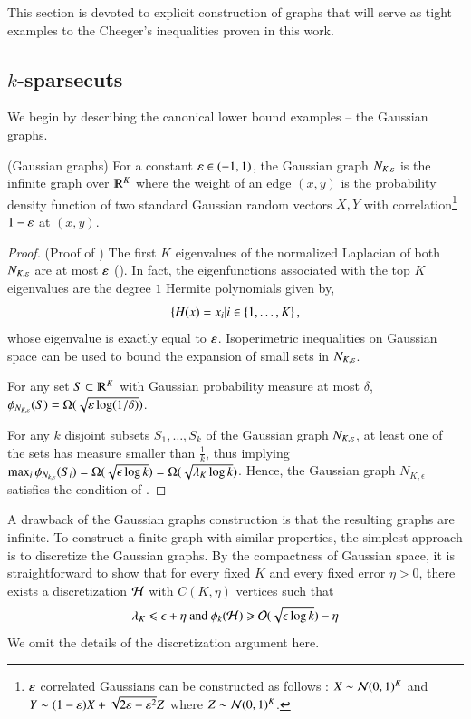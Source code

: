 \documentclass[11pt]{article}
\begin{document}
This section is devoted to explicit construction of graphs that
will serve as tight examples to the Cheeger's inequalities proven in
this work.
%
\subsection{$k$-sparsecuts}
%
We begin by describing the canonical lower bound examples -- the
Gaussian graphs.
\begin{definition} (Gaussian graphs)
For a constant $ \varepsilon \in (-1, 1)$, the Gaussian graph $N_{K,\varepsilon}$ is the
infinite graph over $\R^K$ where the weight
of an edge $(x,y)$ is the probability density function of two standard Gaussian random vectors $X,Y$ with 
correlation\footnote{$\varepsilon$ correlated Gaussians can be constructed as
	follows :  $X \sim \mathcal N(0,1)^K$
and $Y \sim (1 - \varepsilon) X + \sqrt{2 \varepsilon - \varepsilon^2} Z $  where $Z \sim
\mathcal N(0,1)^K$.} $1- \varepsilon$
at $(x,y)$.
\end{definition}
%
%
%

\begin{proof} (Proof of )
The first $K$ eigenvalues of the normalized Laplacian of both
$N_{K,\varepsilon}$ are at most $ \varepsilon$ (\cite{rst12}).  In fact, the
eigenfunctions associated with the top $K$ eigenvalues are the degree
$1$ Hermite polynomials given by,
$$ \{ H(x) = x_i | i \in \{1,\ldots, K\} \,, $$
whose eigenvalue is exactly equal to $\varepsilon$.
%
Isoperimetric inequalities on Gaussian space can be used to bound the
expansion of small sets in $N_{K,\varepsilon}$.
%
\begin{lemma}[\cite{b85}]
For any set $S \subset \R^K$ with Gaussian probability measure at most
$\delta$,
$\phi_{N_{K,\varepsilon}}(S) = \Omega(\sqrt{\varepsilon \log (1/\delta)})$.
\end{lemma}
%
%
For any $k$ disjoint subsets $S_1, \ldots, S_k$ of the
Gaussian graph $N_{K,\varepsilon}$, at least one of the sets has measure
smaller than $\frac{1}{k}$, thus implying $ \max_i
\phi_{N_{k,\varepsilon}}(S_i) = \Omega(\sqrt{\epsilon \log k}) =
\Omega(\sqrt{\lambda_K \log k})$.
Hence, the Gaussian graph $N_{K,\epsilon}$ satisfies the condition of
.
\end{proof}
	A drawback of the Gaussian graphs construction is that the
	resulting graphs are infinite.  To construct a finite graph
	with similar properties, the simplest approach is to
	discretize the Gaussian graphs.  By the compactness of
	Gaussian space, it is straightforward to
	show that for every fixed $K$ and every fixed error
	$\eta > 0$,  there exists a discretization $\mathcal H$ with $C(K,\eta)$
	vertices such that 
	$$ \lambda_K \leqslant \epsilon + \eta \text{   and   } \phi_k(\mathcal H)
	\geqslant \mathcal O(\sqrt{\epsilon \log k}) - \eta $$ 
	We omit the details of the discretization argument here.
\end{document}
